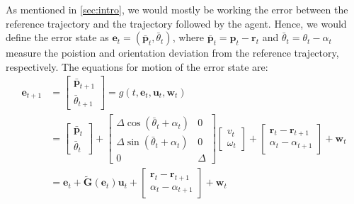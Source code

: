 \documentclass[conference]{IEEEtran}
\begin{document}
As mentioned in \ref{sec:intro}, we would mostly be working the error between the reference trajectory and the trajectory followed by the agent. Hence, we would define the error state as $\mathbf{e}_t = (\bar{\mathbf{p}}_t, \bar{\theta}_t)$, where $\bar{\mathbf{p}}_t = \mathbf{p}_t - \mathbf{r}_t$ and $\bar{\theta}_t = \theta_t - \alpha_t$
measure the poistion and orientation deviation from the reference trajectory, respectively. The equations for motion of the error state are:
\begin{align}\label{eq:error_model}
    \mathbf{e}_{t+1} &= \begin{bmatrix}
        \bar{\mathbf{p}}_{t+1} \\ \bar{\theta}_{t+1}
    \end{bmatrix} = g(t, \mathbf{e}_t, \mathbf{u}_t, \mathbf{w}_t) \\
    &= \begin{bmatrix}
        \bar{\mathbf{p}}_t \\ \bar{\theta}_t \end{bmatrix} + \begin{bmatrix}
            \Delta \cos(\bar{\theta}_t + \alpha_t) & 0 \\ \Delta \sin(\bar{\theta}_t + \alpha_t) & 0 \\ 0 & \Delta
        \end{bmatrix} \begin{bmatrix}
            v_t \\ \omega_t
        \end{bmatrix} + \begin{bmatrix}
            \mathbf{r}_t - \mathbf{r}_{t+1} \\ \alpha_t - \alpha_{t+1}
        \end{bmatrix} + \mathbf{w}_t \\
    &=  \mathbf{e}_t + \tilde{\mathbf{G}}(\mathbf{e}_t) \mathbf{u}_t + \begin{bmatrix}
            \mathbf{r}_t - \mathbf{r}_{t+1} \\ \alpha_t - \alpha_{t+1}
        \end{bmatrix} + \mathbf{w}_t
\end{align}
\end{document}
